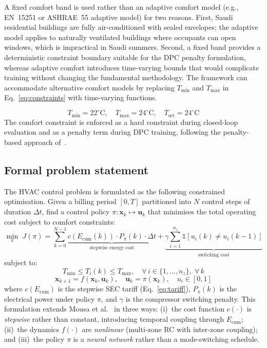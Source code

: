 \documentclass[12pt]{article}
\theoremstyle{plain}
\theoremstyle{definition}
\begin{document}
A fixed comfort band is used rather than an adaptive comfort model (e.g., EN~15251 or ASHRAE~55 adaptive model) for two reasons. First, Saudi residential buildings are fully air-conditioned with sealed envelopes; the adaptive model applies to naturally ventilated buildings where occupants can open windows, which is impractical in Saudi summers. Second, a fixed band provides a deterministic constraint boundary suitable for the DPC penalty formulation, whereas adaptive comfort introduces time-varying bounds that would complicate training without changing the fundamental methodology. The framework can accommodate alternative comfort models by replacing $T_{\min}$ and $T_{\max}$ in Eq.~\ref{eq:constraints} with time-varying functions.

\begin{equation}\label{eq:comfort}
T_{\min} = 22^\circ\text{C}, \quad T_{\max} = 24^\circ\text{C}, \quad T_{\text{set}} = 24^\circ\text{C}
\end{equation}
The comfort constraint is enforced as a hard constraint during closed-loop evaluation and as a penalty term during DPC training, following the penalty-based approach of~\cite{drgona2024dpc}.

\subsection{Formal problem statement}\label{sec:problem}

The HVAC control problem is formulated as the following constrained optimisation. Given a billing period $[0, T]$ partitioned into $N$ control steps of duration $\Delta t$, find a control policy $\pi: \mathbf{x}_k \mapsto \mathbf{u}_k$ that minimises the total operating cost subject to comfort constraints:
\begin{equation}\label{eq:objective}
\min_{\pi} \; J(\pi) = \sum_{k=0}^{N-1} \underbrace{c\!\left(E_{\text{cum}}(k)\right) \cdot P_{\pi}(k) \cdot \Delta t}_{\text{stepwise energy cost}} + \underbrace{\gamma \sum_{i=1}^{n_z} \mathbb{1}[u_i(k) \neq u_i(k\!-\!1)]}_{\text{switching cost}}
\end{equation}
subject to:
\begin{equation}\label{eq:constraints}
T_{\min} \leq T_i(k) \leq T_{\max}, \quad \forall\, i \in \{1,\ldots,n_z\},\; \forall\, k
\end{equation}
\begin{equation}\label{eq:dynamics_constraint}
\mathbf{x}_{k+1} = f(\mathbf{x}_k, \mathbf{u}_k), \quad \mathbf{u}_k = \pi(\mathbf{x}_k), \quad u_i \in [0, 1]
\end{equation}
where $c(E_{\text{cum}})$ is the stepwise SEC tariff (Eq.~\ref{eq:tariff}), $P_\pi(k)$ is the electrical power under policy $\pi$, and $\gamma$ is the compressor switching penalty. This formulation extends Mousa et al.~\cite{mousa2018optimal} in three ways: (i)~the cost function $c(\cdot)$ is \emph{stepwise} rather than constant, introducing temporal coupling through $E_{\text{cum}}$; (ii)~the dynamics $f(\cdot)$ are \emph{nonlinear} (multi-zone RC with inter-zone coupling); and (iii)~the policy $\pi$ is a \emph{neural network} rather than a mode-switching schedule.
\end{document}
